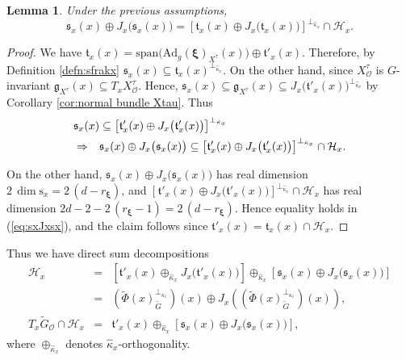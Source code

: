 \documentclass[12pt,a4paper]{article}
\theoremstyle{plain}
\newtheorem{lem}[thm]{Lemma}%
\theoremstyle{definition}
\begin{document}
\begin{lem}
\label{lem:s_x orthocomplement}
Under the previous assumptions, 
$$
\mathfrak{s}_x(x)\oplus J_x\big( \mathfrak{s}_x(x) \big)
=\left[ \mathfrak{t}_x(x)\oplus J_x\big(
\mathfrak{t}_x(x)\big)\right]^{\perp_{\hat{\kappa}_x}}\cap \mathcal{H}_x.
$$
\end{lem}

\begin{proof}
We have 
$\mathfrak{t}_x(x)=\mathrm{span}\big(
\mathrm{Ad}_g(
\boldsymbol{\xi})_{X^\tau}(x)
\big)
\oplus \mathfrak{t}'_x(x)$. 
Therefore, by Definition \ref{defn:sfrakx} 
$\mathfrak{s}_x(x)\subseteq \mathfrak{t}_x(x)^{\perp_{\hat{\kappa}_x}}$.
On the other hand, since $X^\tau_{\mathcal{O}}$
is $G$-invariant $\mathfrak{g}_{X^\tau}(x)\subseteq
T_xX^\tau_{\mathcal{O}}$.
Hence, $\mathfrak{s}_x(x)\subseteq \mathfrak{g}_{X^\tau}(x)
\subseteq 
J_x\big( \mathfrak{t}'_x(x) \big)^{\perp_{\hat{\kappa}_x}}$
by Corollary \ref{cor:normal bundle Xtau}.
Thus
\begin{eqnarray}
\label{eq:sxJxsx}
\lefteqn{\mathfrak{s}_x(x)\subseteq \left[\mathfrak{t}'_x(x)
\oplus J_x\big( \mathfrak{t}'_x(x) \big)\right]
^{\perp_{\hat{\kappa}_x}}}\nonumber\\
&\Rightarrow&
\mathfrak{s}_x(x)\oplus 
J_x\big(\mathfrak{s}_x(x)   \big)\subseteq \left[\mathfrak{t}'_x(x)
\oplus J_x\big( \mathfrak{t}'_x(x) \big)\right]
^{\perp_{\hat{\kappa}_x}}\cap \mathcal{H}_x.
\end{eqnarray}

On the other hand, 
$\mathfrak{s}_x(x)\oplus 
J_x\big(\mathfrak{s}_x(x)   \big)$ has real dimension
$2\,\dim \mathrm{s}_x=2\,(d-r_{\boldsymbol{\xi}})$,
and 
$\left[\mathfrak{t}'_x(x)
\oplus J_x\big( \mathfrak{t}'_x(x) \big)\right]
^{\perp_{\hat{\kappa}_x}}\cap \mathcal{H}_x$ has 
real dimension 
$2d-2-2\,(r_{\boldsymbol{\xi}}-1)=
2\,(d-r_{\boldsymbol{\xi}})$.
Hence equality holds in (\ref{eq:sxJxsx}), and the
claim follows since $\mathfrak{t}'_x(x)=
\mathfrak{t}_x(x)\cap \mathcal{H}_x$.
\end{proof}

Thus we have direct sum decompositions
\begin{eqnarray}
\label{eqn:direct sums T_x}
\mathcal{H}_x&=&\left[\mathfrak{t}'_x(x)
\oplus_{\hat{\kappa}_x} J_x\big( \mathfrak{t}'_x(x) \big)\right]\oplus 
_{\hat{\kappa}_x}
\left[\mathfrak{s}_x(x)\oplus J_x\big(\mathfrak{s}_x(x)  \big)   \right]\\
&=&(\tilde{\Phi}(x)^{\perp_{\kappa_e}}_{\tilde{G}})(x)
\oplus J_x\left((\tilde{\Phi}(x)^{\perp_{\kappa_e}}_{\tilde{G}})(x)\right),\nonumber\\
T_x\tilde{G}_{\mathcal{O}}\cap \mathcal{H}_x&=&
\mathfrak{t}'_x(x)
\oplus_{\hat{\kappa}_x}\left[\mathfrak{s}_x(x)\oplus J_x\big(\mathfrak{s}_x(x)  \big)   \right],\nonumber
\end{eqnarray}
where $\oplus_{\hat{\kappa}_x}$ denotes
$\hat{\kappa}_x$-orthogonality. 
\end{document}
